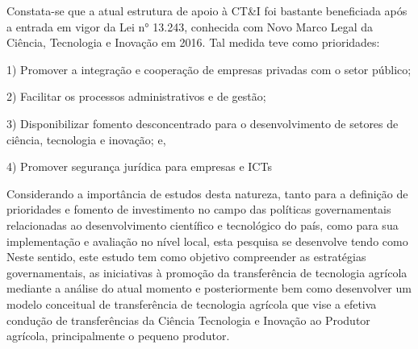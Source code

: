 Constata-se que a atual estrutura de apoio à CT\&I foi bastante beneficiada após a entrada em vigor da Lei n° 13.243, conhecida com Novo Marco Legal da Ciência, Tecnologia e Inovação em 2016. Tal medida teve como prioridades: 

1) Promover a integração e cooperação de empresas privadas com o setor público;

2) Facilitar os processos administrativos e de gestão;

3) Disponibilizar fomento desconcentrado para o desenvolvimento de setores de ciência, tecnologia e inovação; e,

4) Promover segurança jurídica para empresas e ICTs 


Considerando a importância de estudos desta natureza, tanto para a definição de prioridades e fomento de investimento no campo das políticas governamentais relacionadas ao desenvolvimento científico e tecnológico do país, como para sua implementação e avaliação no nível local, esta pesquisa se desenvolve tendo como Neste sentido, este estudo tem como objetivo compreender as estratégias governamentais, as iniciativas à promoção da transferência de tecnologia agrícola mediante a análise do atual momento e posteriormente bem como desenvolver um modelo conceitual de transferência de tecnologia agrícola que vise a efetiva condução de transferências da Ciência Tecnologia e Inovação ao Produtor agrícola, principalmente o pequeno produtor. 





